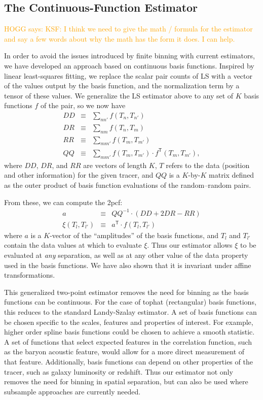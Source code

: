 \documentclass[12pt, fullpage, letterpaper]{article}
\newcommand{\HOGG}[1]{\textcolor{orange}{HOGG says: #1}}
\newcommand{\cf}{2pcf\xspace}
\newcommand{\LS}{LS\xspace}
\newcommand{\inv}{^{-1}}
\newcommand{\T}{^{\mathsf{T}}}
\begin{document}
\subsection{The Continuous-Function Estimator}

\HOGG{KSF: I think we need to give the math / formula for the estimator and say a few words about why the math has the form it does. I can help.}

In order to avoid the issues introduced by finite binning with current estimators, we have developed an approach based on continuous basis functions. 
Inspired by linear least-squares fitting, we replace the scalar pair counts of \LS with a vector of the values output by the basis function, and the normalization term by a tensor of these values.
We generalize the \LS estimator above to any set of $K$ basis functions $f$ of the pair, so we now have
\begin{eqnarray}\displaystyle
DD &\equiv& \sum_{n n'} f(T_n, T_{n'}) \\
DR &\equiv& \sum_{n m} f(T_n, T_{m}) \\
RR &\equiv& \sum_{m m'} f(T_m, T_{m'}) \\
QQ &\equiv& \sum_{m m'} f(T_m, T_{m'}) \cdot f\T(T_m, T_{m'}),
\end{eqnarray}
where $DD$, $DR$, and $RR$ are vectors of length $K$, $T$ refers to the data (position and other information) for the given tracer, and $QQ$ is a $K$-by-$K$ matrix defined as the outer product of basis function evaluations of the random--random pairs.

From these, we can compute the \cf:
\begin{eqnarray}\displaystyle
a &\equiv& QQ\inv \cdot (DD + 2DR - RR) \\
\xi(T_l, T_{l'}) &\equiv& a\T \cdot f(T_l, T_{l'})
\end{eqnarray}
where $a$ is a $K$-vector of the ``amplitudes'' of the basis functions, and $T_l$ and $T_{l'}$ contain the data values at which to evaluate $\xi$.
Thus our estimator allows $\xi$ to be evaluated at \emph{any} separation, as well as at any other value of the data property used in the basis functions.
We have also shown that it is invariant under affine transformations.

This generalized two-point estimator removes the need for binning as the basis functions can be continuous.
For the case of tophat (rectangular) basis functions, this reduces to the standard Landy-Szalay estimator.
A set of basis functions can be chosen specific to the scales, features and properties of interest.
For example, higher order spline basis functions could be chosen to achieve a smooth statistic. 
A set of functions that select expected features in the correlation function, such as the baryon acoustic feature, would allow for a more direct measurement of that feature.
Additionally, basis functions can depend on other properties of the tracer, such as galaxy luminosity or redshift.
Thus our estimator not only removes the need for binning in spatial separation, but can also be used where subsample approaches are currently needed.
\end{document}
